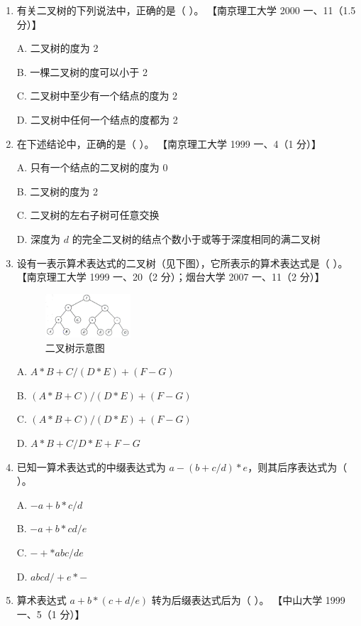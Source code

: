 \documentclass[lang=cn,newtx,10pt,scheme=chinese]{elegantbook}
\begin{document}
\begin{enumerate}
    \item 有关二叉树的下列说法中，正确的是（ ）。  
    【南京理工大学 2000 一、11（1.5 分）】  

    A. 二叉树的度为 2  

    B. 一棵二叉树的度可以小于 2  

    C. 二叉树中至少有一个结点的度为 2  

    D. 二叉树中任何一个结点的度都为 2  

    \item 在下述结论中，正确的是（ ）。  
    【南京理工大学 1999 一、4（1 分）】 

    A. 只有一个结点的二叉树的度为 0  

    B. 二叉树的度为 2  

    C. 二叉树的左右子树可任意交换  

    D. 深度为 $d$ 的完全二叉树的结点个数小于或等于深度相同的满二叉树  

    \item 设有一表示算术表达式的二叉树（见下图），它所表示的算术表达式是（ ）。  
    【南京理工大学 1999 一、20（2 分）；烟台大学 2007 一、11（2 分）】  

    \begin{figure}[h!]
        \centering
        \includegraphics[width=0.3\textwidth]{./figure/exercisePicPDF/chapter6/6-30.pdf}
        \caption{二叉树示意图}
    \end{figure}

    A. $A \ast B + C / (D \ast E) + (F - G)$  

    B. $(A \ast B + C) / (D \ast E) + (F - G)$  

    C. $(A \ast B + C) / (D \ast E) + (F - G)$  

    D. $A \ast B + C / D \ast E + F - G$  

    \item 已知一算术表达式的中缀表达式为 $a - (b + c/d) \ast e$，则其后序表达式为（ ）。
    
    A. $-a + b \ast c / d$  

    B. $-a + b \ast cd/e$  


    C. $-+*abc/de$  

    D. $abcd /+e*-$  

    \item 算术表达式 $a + b \ast (c + d / e)$ 转为后缀表达式后为（ ）。  
    【中山大学 1999 一、5（1 分）】  


\end{enumerate}
\end{document}
